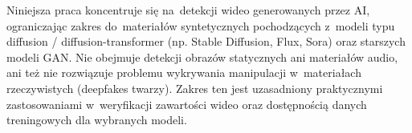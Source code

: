 Niniejsza praca koncentruje si\k{e} na~detekcji wideo generowanych przez AI,
ograniczaj\k{a}c zakres do~materia\l{}\'{o}w syntetycznych pochodz\k{a}cych
z~modeli typu diffusion / diffusion-transformer (np. Stable Diffusion, Flux, Sora)
oraz starszych modeli GAN.
Nie obejmuje detekcji obraz\'{o}w statycznych ani materia\l{}\'{o}w audio,
ani te\.{z} nie rozwi\k{a}zuje problemu wykrywania manipulacji w~materia\l{}ach
rzeczywistych (deepfakes twarzy). Zakres ten jest uzasadniony praktycznymi
zastosowaniami w~weryfikacji zawarto\'{s}ci wideo oraz dost\k{e}pno\'{s}ci\k{a}
danych treningowych dla wybranych modeli.
